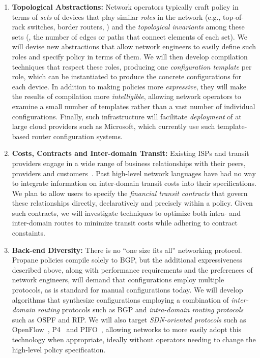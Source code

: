 \begin{enumerate}

\item {\bf Topological Abstractions:} Network operators typically craft policy in terms of \emph{sets} of devices that
play similar \emph{roles} in the network (e.g., top-of-rack switches, border routers, \etc) and the  \emph{topological invariants} among these sets (\eg, the number of edges or paths that connect elements of each set).  We will devise new abstractions that allow network engineers to easily define such roles and specify policy in terms of them.  We will then develop compilation techniques that respect these roles, producing one {\em configuration template} per role, which can be instantiated to produce the concrete configurations for each device.  
In addition to making policies more \emph{expressive},
they will make the results of compilation more \emph{intelligible}, allowing
network operators to examine a small number of templates
rather than a vast number of individual configurations.  Finally,
such infrastructure will facilitate \emph{deployment} of \Name
at large cloud providers such as Microsoft, which currently use such
template-based router configuration systems.

\item {\bf Costs, Contracts and Inter-domain Transit:} 
Existing ISPs and transit providers engage in a wide range of business
relationships with their peers, providers and customers~\cite{routingplaybook}.
Past high-level network languages have had no way to integrate
information on inter-domain transit costs into their specifications.
We plan to allow users to specify the 
\emph{financial transit contracts} that govern these relationships
directly, declaratively and precisely within a \Name policy.  Given
such contracts, we will investigate techniques to optimize 
both intra- and inter-domain routes to minimize transit costs while adhering
to contract constaints.

\item {\bf Back-end Diversity:} There is no ``one size fits all'' networking protocol. Propane policies compile solely to BGP, but the additional expressiveness described above, along with performance requirements and the preferences of network engineers, will demand that configurations employ multiple protocols, as is standard for manual configurations today.  We will develop algorithms that synthesize configurations employing a combination of \emph{inter-domain routing} protocols such as BGP and \emph{intra-domain routing protocols} such as OSPF and RIP.  We will also target
\emph{SDN-oriented protocols} such as OpenFlow~\cite{openflow}, P4~\cite{P4} and PIFO~\cite{pifo}, allowing networks to more easily adopt this technology when appropriate, ideally 
without operators needing to change the high-level policy specification.


\end{enumerate}
